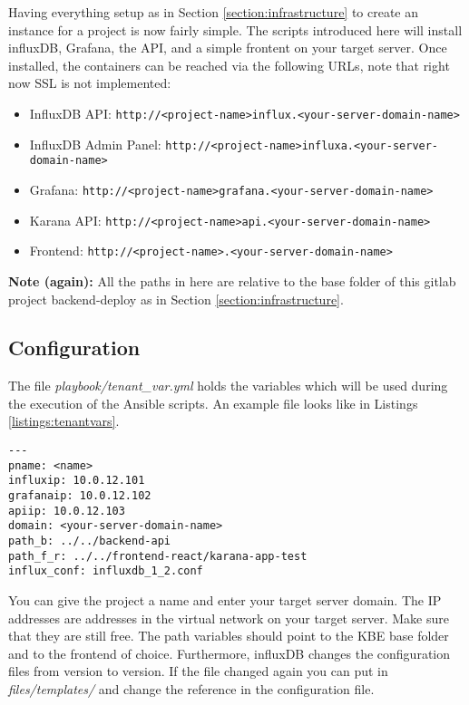 Having everything setup as in Section \ref{section:infrastructure} to create an instance for a project is now fairly simple. The scripts introduced here will install influxDB, Grafana, the API, and a simple frontent on your target server. Once installed, the containers can be reached via the following URLs, note that right now SSL is not implemented:
\begin{itemize}
	\item InfluxDB API: \nolinkurl{http://<project-name>influx.<your-server-domain-name>}
	\item InfluxDB Admin Panel: \nolinkurl{http://<project-name>influxa.<your-server-domain-name>}	
	\item Grafana: \nolinkurl{http://<project-name>grafana.<your-server-domain-name>}
	\item Karana API: \nolinkurl{http://<project-name>api.<your-server-domain-name>}
	\item Frontend: \nolinkurl{http://<project-name>.<your-server-domain-name>}
\end{itemize}
\textbf{Note (again):} All the paths in here are relative to the base folder of this gitlab project backend-deploy as in Section \ref{section:infrastructure}.

\subsection{Configuration}
The file \textit{playbook/tenant\_var.yml} holds the variables which will be used during the execution of the Ansible scripts. An example file looks like in Listings \ref{listings:tenantvars}.
\begin{lstlisting}[caption={Example of Ansible hosts file},label={listings:tenantvars}]
---
pname: <name>
influxip: 10.0.12.101
grafanaip: 10.0.12.102
apiip: 10.0.12.103
domain: <your-server-domain-name>
path_b: ../../backend-api
path_f_r: ../../frontend-react/karana-app-test
influx_conf: influxdb_1_2.conf
\end{lstlisting}
You can give the project a name and enter your target server domain. The IP addresses are addresses in the virtual network on your target server. Make sure that they are still free. The path variables should point to the KBE base folder and to the frontend of choice. Furthermore, influxDB changes the configuration files from version to version. If the file changed again you can put in \textit{files/templates/} and change the reference in the configuration file. 

